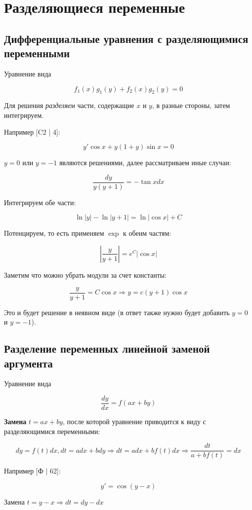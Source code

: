 \section{Разделяющиеся переменные}

\subsection{Дифференциальные уравнения с разделяющимися переменными}

Уравнение вида

\[
f_1(x)g_1(y) + f_2(x)g_2(y) = 0
\]

Для решения \textit{разделяем} части, содержащие $x$ и $y$, в разные стороны, затем интегрируем.

Например [C2 | 4]:

\[
y'\cos{x}+y(1+y)\sin{x}=0
\]

$y=0$ или $y=-1$ являются решениями, далее рассматриваем иные случаи:

\[
\frac{dy}{y(y+1)}=-\tan{x}dx
\]

Интегрируем обе части:

\[
\ln{|y|}-\ln{|y+1|}=\ln{|\cos{x}|}+C
\]

Потенцируем, то есть применяем $\exp$ к обеим частям:

\[
\left|\frac{y}{y+1}\right|=e^C|\cos{x}|
\]

Заметим что можно убрать модули за счет константы:

\[
\frac{y}{y+1}=C\cos{x} \Rightarrow y=c(y+1)\cos{x}
\]

Это и будет решение в неявном виде (в ответ также нужно будет добавить $y=0$ и $y=-1$).

\subsection{Разделение переменных линейной заменой аргумента}

Уравнение вида

\[
\frac{dy}{dx} = f(ax + by)
\]

\textbf{Замена} $t = ax + by$, после которой уравнение приводится к виду с разделяющимися переменными:

\[
dy=f(t)dx, dt=adx+bdy \Rightarrow dt=adx+bf(t)dx \Rightarrow \frac{dt}{a+bf(t)}=dx
\]

Например [Ф | 62]:

\[
y'=\cos(y-x)
\]

Замена $t=y-x \Rightarrow dt=dy-dx$

